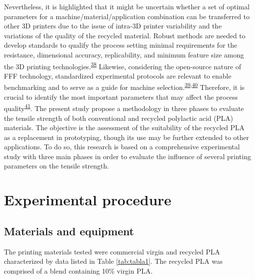 \documentclass[
  12pt]{article}
\begin{document}
Nevertheless, it is highlighted that it might be uncertain whether a set of optimal parameters for a machine/material/application combination can be transferred to other 3D printers due to the issue of intra-3D printer variability and the variations of the quality of the recycled material.
Robust methods are needed to develop standards to qualify the process setting minimal requirements for the resistance, dimensional accuracy, replicability, and minimum feature size among the 3D printing technologies.\textsuperscript{\protect\hyperlink{ref-Rebaioli2017}{38}}
Likewise, considering the open-source nature of FFF technology, standardized experimental protocols are relevant to enable benchmarking and to serve as a guide for machine selection.\textsuperscript{\protect\hyperlink{ref-CruzSanchez2014}{39},\protect\hyperlink{ref-Roberson2013}{40}}
Therefore, it is crucial to identify the most important parameters that may affect the process quality\textsuperscript{\protect\hyperlink{ref-JaisinghSheoran2019}{41}}.
The present study propose a methodology in three phases to evaluate the tensile strength of both conventional and recycled polylactic acid (PLA) materials. The objective is the assessment of the suitability of the recycled PLA as a replacement in prototyping, though its use may be further extended to other applications. To do so, this research is based on a comprehensive experimental study with three main phases in order to evaluate the influence of several printing parameters on the tensile strength.

\hypertarget{section:experimental}{%
\section{Experimental procedure}\label{section:experimental}}

\hypertarget{materials-and-equipment}{%
\subsection{Materials and equipment}\label{materials-and-equipment}}

The printing materials tested were commercial virgin and recycled PLA characterized by data listed in Table \ref{tab:tabla1}.
The recycled PLA was comprised of a blend containing 10\% virgin PLA.

\providecommand{\docline}[3]{\noalign{\global\setlength{\arrayrulewidth}{#1}}\arrayrulecolor[HTML]{#2}\cline{#3}}

\setlength{\tabcolsep}{2pt}
\end{document}
